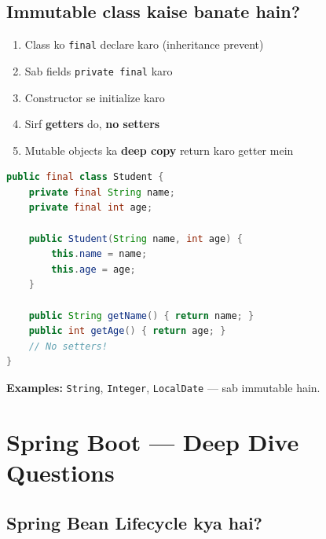 \documentclass[12pt,a4paper]{article}
\begin{document}
\subsection{Immutable class kaise banate hain?}

\begin{answerbox}
\begin{enumerate}
    \item Class ko \texttt{final} declare karo (inheritance prevent)
    \item Sab fields \texttt{private final} karo
    \item Constructor se initialize karo
    \item Sirf \textbf{getters} do, \textbf{no setters}
    \item Mutable objects ka \textbf{deep copy} return karo getter mein
\end{enumerate}
\begin{lstlisting}[language=Java]
public final class Student {
    private final String name;
    private final int age;
    
    public Student(String name, int age) {
        this.name = name;
        this.age = age;
    }
    
    public String getName() { return name; }
    public int getAge() { return age; }
    // No setters!
}
\end{lstlisting}
\textbf{Examples:} \texttt{String}, \texttt{Integer}, \texttt{LocalDate} --- sab immutable hain.
\end{answerbox}

\section{Spring Boot --- Deep Dive Questions}

\setcounter{subsection}{60}

\subsection{Spring Bean Lifecycle kya hai?}
\end{document}

